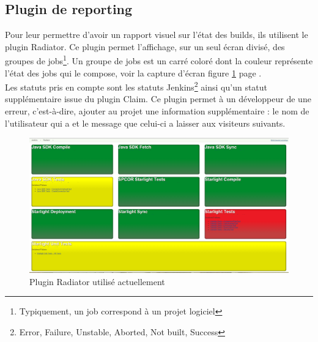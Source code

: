 \subsection{Plugin de reporting}
Pour leur permettre d'avoir un rapport visuel sur l'état des builds, ils utilisent le plugin Radiator. Ce plugin permet l'affichage, sur un seul écran divisé, des groupes de jobs\footnote{Typiquement, un job correspond à un projet logiciel}. Un groupe de jobs est un carré coloré dont la couleur représente l'état des jobs qui le compose, voir la capture d'écran figure \ref{figure:radiatorActual} page \pageref{figure:radiatorActual}.\\
Les statuts pris en compte sont les statuts Jenkins\footnote{Error, Failure, Unstable, Aborted, Not built, Success} ainsi qu'un statut supplémentaire issue du plugin Claim. Ce plugin permet à un développeur de  une erreur, c'est-à-dire, ajouter au projet une information supplémentaire : le nom de l'utilisateur qui a  et le message que celui-ci a laisser aux visiteurs suivants.




\begin{figure}[!h]
  \centering
      \includegraphics[width=\textwidth]{images/radiatorActual.png}
  \caption{Plugin Radiator utilisé actuellement}
	\label{figure:radiatorActual}
\end{figure}

